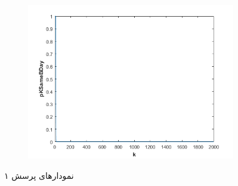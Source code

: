 \documentclass[11pt]{article}
\theoremstyle{definition}
\theoremstyle{lemma}
\theoremstyle{remark}
\begin{document}
\begin{figure}[h!]
		\begin{subfigure}[h!]{0.48\textwidth}
			\includegraphics[width=\textwidth]{./Images/1/3.png}
			\caption{  }
		\end{subfigure}
		
		\caption{نمودار‌های پرسش ۱}
		\label{q1}
	\end{figure}
	
\end{document}

